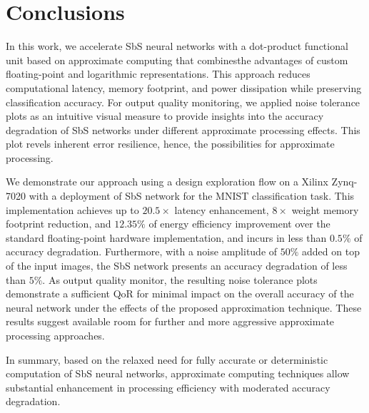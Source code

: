 \section{Conclusions}
\label{sec:conclusions}
In this work, we accelerate SbS neural networks with a dot-product functional unit based on approximate computing that combinesthe advantages of custom floating-point and logarithmic representations. This approach reduces computational latency, memory footprint, and power dissipation while preserving classification accuracy. For output quality monitoring, we applied noise tolerance plots as an intuitive visual measure to provide insights into the accuracy degradation of SbS networks under different approximate processing effects. This plot revels inherent error resilience, hence, the possibilities for approximate processing.


We demonstrate our approach using a design exploration flow on a Xilinx Zynq-7020 with a deployment of SbS network for the MNIST classification task. This implementation achieves up to $20.5\times$ latency enhancement, $8\times$ weight memory footprint reduction, and $12.35\%$ of energy efficiency improvement over the standard floating-point hardware implementation, and incurs in less than $0.5\%$ of accuracy degradation. Furthermore, with a noise amplitude of $50\%$ added on top of the input images, the SbS network presents an accuracy degradation of less than $5\%$. As output quality monitor, the resulting noise tolerance plots demonstrate a sufficient QoR for minimal impact on the overall accuracy of the neural network under the effects of the proposed approximation technique. These results suggest available room for further and more aggressive approximate processing approaches.


In summary, based on the relaxed need for fully accurate or deterministic computation of SbS neural networks, approximate computing techniques allow substantial enhancement in processing efficiency with moderated accuracy degradation.

